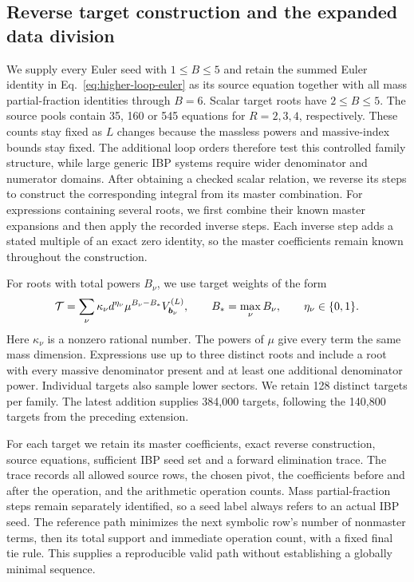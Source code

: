 \subsection{Reverse target construction and the expanded data division}
We supply every Euler seed with $1\leq B\leq5$ and retain the
summed Euler identity in Eq.~\eqref{eq:higher-loop-euler} as its
source equation together with all mass partial-fraction identities
through $B=6$. Scalar target roots have $2\leq B\leq5$.
The source pools contain 35, 160 or 545 equations for $R=2,3,4$,
respectively. These counts stay fixed as $L$ changes because the
massless powers and massive-index bounds stay fixed. The additional
loop orders therefore test this controlled family structure, while
large generic IBP systems require wider denominator and numerator
domains.
After obtaining a checked scalar relation, we reverse its steps to
construct the corresponding integral from its master combination.
For expressions containing several roots, we first combine their
known master expansions and then apply the recorded inverse steps.
Each inverse step adds a stated multiple of an exact zero identity,
so the master coefficients remain known throughout the construction.

For roots with total powers $B_\nu$, we use target weights of the form
\begin{equation}
 {\cal T}=\sum_\nu
   \kappa_\nu d^{\eta_\nu}\mu^{B_\nu-B_*}
                       V^{(L)}_{\boldsymbol b_\nu},
 \qquad
 B_*=\max_\nu B_\nu,\qquad \eta_\nu\in\{0,1\}.
 \label{eq:higher-loop-target-weights}
\end{equation}
Here $\kappa_\nu$ is a nonzero rational number. The powers of $\mu$
give every term the same mass dimension. Expressions use up to three
distinct roots and include a root with every massive denominator
present and at least one additional denominator power. Individual
targets also sample lower sectors. We retain 128 distinct targets
per family. The latest addition supplies 384,000 targets, following
the 140,800 targets from the preceding extension.

For each target we retain its master coefficients, exact reverse
construction, source equations, sufficient IBP seed set and a
forward elimination trace. The trace records all allowed source
rows, the chosen pivot, the coefficients before and after the
operation, and the arithmetic operation counts. Mass
partial-fraction steps remain separately identified, so a seed label
always refers to an actual IBP seed. The reference path minimizes
the next symbolic row's number of nonmaster terms, then its total
support and immediate operation count, with a fixed final tie rule.
This supplies a reproducible valid path without establishing a
globally minimal sequence.

